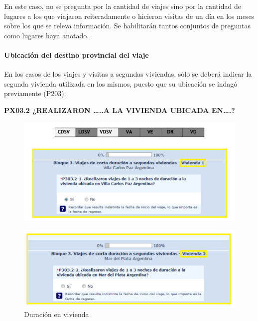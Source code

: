 \documentclass[
  openany]{book}
\begin{document}
En este caso, no se pregunta por la cantidad de viajes sino por la cantidad de lugares a los que viajaron reiteradamente o hicieron visitas de un día en los meses sobre los que se releva información. Se habilitarán tantos conjuntos de preguntas como lugares haya anotado.

\hypertarget{ubicaciuxf3n-del-destino-provincial-del-viaje}{%
\paragraph{Ubicación del destino provincial del viaje}\label{ubicaciuxf3n-del-destino-provincial-del-viaje}}

En los casos de los viajes y visitas a segundas viviendas, sólo se deberá indicar la segunda vivienda utilizada en los mismos, puesto que su ubicación se indagó previamente (P203).

\textbf{PX03.2 ¿REALIZARON \ldots..A LA VIVIENDA UBICADA EN\ldots.?}

\begin{figure}

{\centering \includegraphics[width=1\linewidth]{imagenes/figura6-76} 

}

\end{figure}

\begin{figure}

{\centering \includegraphics[width=1\linewidth]{imagenes/figura6-77} 

}

\caption{Duración en vivienda}\label{fig:duracion2}
\end{figure}
\end{document}
